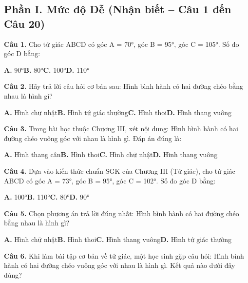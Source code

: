 \documentclass[11pt,a4paper]{article}
\begin{document}
\subsection*{\color{accent} Phần I. Mức độ Dễ (Nhận biết -- Câu 1 đến Câu 20)}
\textbf{\color{primary} Câu 1.} Cho tứ giác ABCD có góc A = 70°, góc B = 95°, góc C = 105°. Số đo góc D bằng:\par
\hspace*{1.5em}\textbf{A.} 90°\quad\quad \textbf{B.} 80°\quad\quad \textbf{C.} 100°\quad\quad \textbf{D.} 110°\par\vspace{2pt}
\textbf{\color{primary} Câu 2.} Hãy trả lời câu hỏi cơ bản sau: Hình bình hành có hai đường chéo bằng nhau là hình gì?\par
\hspace*{1.5em}\textbf{A.} Hình chữ nhật\quad\quad \textbf{B.} Hình tứ giác thường\quad\quad \textbf{C.} Hình thoi\quad\quad \textbf{D.} Hình thang vuông\par\vspace{2pt}
\textbf{\color{primary} Câu 3.} Trong bài học thuộc Chương III, xét nội dung: Hình bình hành có hai đường chéo vuông góc với nhau là hình gì. Đáp án đúng là:\par
\hspace*{1.5em}\textbf{A.} Hình thang cân\quad\quad \textbf{B.} Hình thoi\quad\quad \textbf{C.} Hình chữ nhật\quad\quad \textbf{D.} Hình thang vuông\par\vspace{2pt}
\textbf{\color{primary} Câu 4.} Dựa vào kiến thức chuẩn SGK của Chương III (Tứ giác), cho tứ giác ABCD có góc A = 73°, góc B = 95°, góc C = 102°. Số đo góc D bằng:\par
\hspace*{1.5em}\textbf{A.} 100°\quad\quad \textbf{B.} 110°\quad\quad \textbf{C.} 80°\quad\quad \textbf{D.} 90°\par\vspace{2pt}
\textbf{\color{primary} Câu 5.} Chọn phương án trả lời đúng nhất: Hình bình hành có hai đường chéo bằng nhau là hình gì?\par
\hspace*{1.5em}\textbf{A.} Hình chữ nhật\quad\quad \textbf{B.} Hình thoi\quad\quad \textbf{C.} Hình thang vuông\quad\quad \textbf{D.} Hình tứ giác thường\par\vspace{2pt}
\textbf{\color{primary} Câu 6.} Khi làm bài tập cơ bản về tứ giác, một học sinh gặp câu hỏi: Hình bình hành có hai đường chéo vuông góc với nhau là hình gì. Kết quả nào dưới đây đúng?\par
\end{document}
